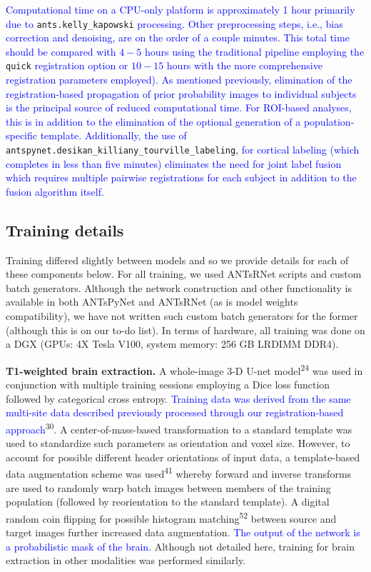 \documentclass[12pt,]{article}
\begin{document}
\textcolor{blue}{Computational time on a CPU-only platform is approximately 1
hour primarily due to} \texttt{ants.kelly\_kapowski}
\textcolor{blue}{processing.
Other preprocessing steps, i.e., bias correction and denoising, are on the order of a
couple minutes. This total time should be compared with $4-5$ hours
using the traditional pipeline employing the} \texttt{quick}
\textcolor{blue}{registration option or $10-15$ hours with the more
comprehensive registration parameters employed).  As mentioned previously,
elimination of the registration-based propagation of prior probability images to
individual subjects is the principal source of reduced computational time. For
ROI-based analyses, this is in addition to the elimination of the optional
generation of a population-specific template. Additionally, the use of}
\texttt{antspynet.desikan\_killiany\_tourville\_labeling},
\textcolor{blue}{for cortical
labeling (which completes in less than five minutes) eliminates the need for
joint label fusion which requires multiple pairwise registrations for each
subject in addition to the fusion algorithm itself.}

\hypertarget{training-details}{%
\subsection*{Training details}\label{training-details}}

Training differed slightly between models and so we provide details for
each of these components below. For all training, we used ANTsRNet
scripts and custom batch generators. Although the network construction
and other functionality is available in both ANTsPyNet and ANTsRNet (as
is model weights compatibility), we have not written such custom batch
generators for the former (although this is on our to-do list). In terms
of hardware, all training was done on a DGX (GPUs: 4X Tesla V100, system
memory: 256 GB LRDIMM DDR4).

\textbf{T1-weighted brain extraction.} A whole-image 3-D U-net
model\textsuperscript{24} was used in conjunction with multiple training
sessions employing a Dice loss function followed by categorical cross
entropy. \textcolor{blue}{Training data
was derived from the same multi-site data described previously processed through
our registration-based approach}\textsuperscript{30}. A
center-of-mass-based transformation to a standard template was used to
standardize such parameters as orientation and voxel size. However, to
account for possible different header orientations of input data, a
template-based data augmentation scheme was used\textsuperscript{41}
whereby forward and inverse transforms are used to randomly warp batch
images between members of the training population (followed by
reorientation to the standard template). A digital random coin flipping
for possible histogram matching\textsuperscript{52} between source and
target images further increased data augmentation.
\textcolor{blue}{The output of the network
is a probabilistic mask of the brain.} Although not detailed here,
training for brain extraction in other modalities was performed
similarly.
\end{document}

